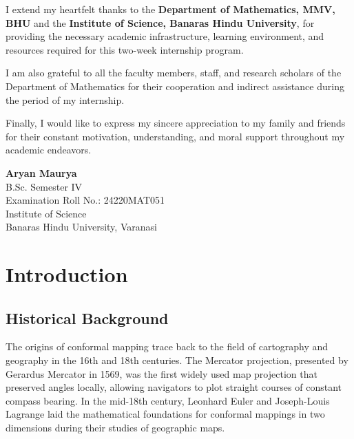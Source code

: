 \documentclass[12pt,a4paper]{article}
\begin{document}
I extend my heartfelt thanks to the \textbf{Department of Mathematics, MMV, BHU} and the \textbf{Institute of Science, Banaras Hindu University}, for providing the necessary academic infrastructure, learning environment, and resources required for this two-week internship program.

I am also grateful to all the faculty members, staff, and research scholars of the Department of Mathematics for their cooperation and indirect assistance during the period of my internship.

Finally, I would like to express my sincere appreciation to my family and friends for their constant motivation, understanding, and moral support throughout my academic endeavors.

\vspace{1.5cm}

\begin{flushright}
    \textbf{Aryan Maurya}\\
    B.Sc. Semester IV\\
    Examination Roll No.: 24220MAT051\\
    Institute of Science\\
    Banaras Hindu University, Varanasi
\end{flushright}

\clearpage
\restoregeometry
\pagestyle{fancy}
\hypersetup{pageanchor=true}

\tableofcontents
\newpage


\section{Introduction}
\subsection{Historical Background}
The origins of conformal mapping trace back to the field of cartography and geography in the 16th and 18th centuries. The Mercator projection, presented by Gerardus Mercator in 1569, was the first widely used map projection that preserved angles locally, allowing navigators to plot straight courses of constant compass bearing. In the mid-18th century, Leonhard Euler and Joseph-Louis Lagrange laid the mathematical foundations for conformal mappings in two dimensions during their studies of geographic maps.
\end{document}
